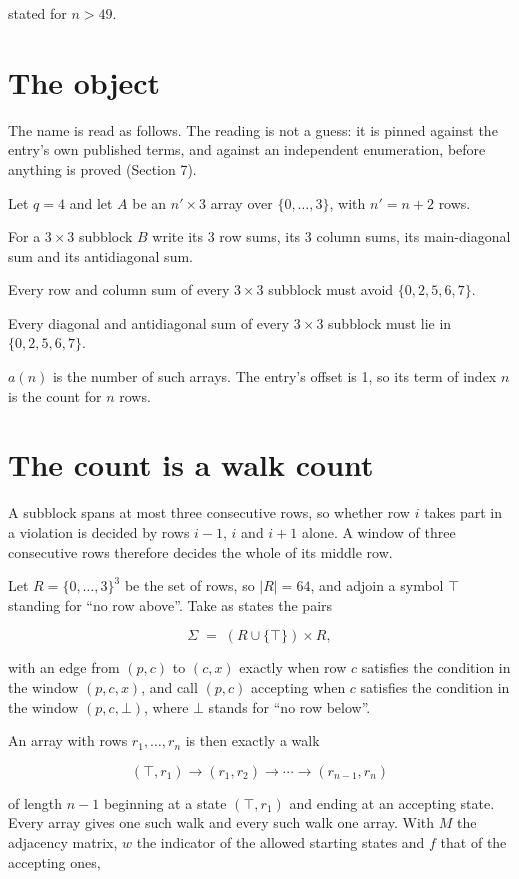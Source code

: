 \documentclass[11pt]{article}
\theoremstyle{definition}
\begin{document}
stated for $n > 49$.

\section{The object}

The name is read as follows. The reading is not a guess: it is pinned against the entry's own published terms, and against an independent enumeration, before anything is proved (Section 7).

Let $q = 4$ and let $A$ be an $n' \times 3$ array over $\{0,\dots,3\}$, with $n' = n + 2$ rows.

For a $3\times3$ subblock $B$ write its 3 row sums, its 3 column sums, its main-diagonal sum and its antidiagonal sum.

Every row and column sum of every $3\times3$ subblock must avoid $\{0, 2, 5, 6, 7\}$.

Every diagonal and antidiagonal sum of every $3\times3$ subblock must lie in $\{0, 2, 5, 6, 7\}$.

$a(n)$ is the number of such arrays. The entry's offset is 1, so its term of index $n$ is the count for $n$ rows.

\section{The count is a walk count}

A subblock spans at most three consecutive rows, so whether row $i$ takes part in a violation is decided by rows $i-1$, $i$ and $i+1$ alone. A window of three consecutive rows therefore decides the whole of its middle row.

Let $R = \{0,\dots,3\}^{3}$ be the set of rows, so $|R| = 64$, and adjoin a symbol $\top$ standing for ``no row above''. Take as states the pairs

\[\Sigma \;=\; (R \cup \{\top\}) \times R,\]

with an edge from $(p,c)$ to $(c,x)$ exactly when row $c$ satisfies the condition in the window $(p,c,x)$, and call $(p,c)$ accepting when $c$ satisfies the condition in the window $(p,c,\bot)$, where $\bot$ stands for ``no row below''.

An array with rows $r_1,\dots,r_n$ is then exactly a walk

\[(\top,r_1) \to (r_1,r_2) \to \cdots \to (r_{n-1},r_n)\]

of length $n-1$ beginning at a state $(\top,r_1)$ and ending at an accepting state. Every array gives one such walk and every such walk one array. With $M$ the adjacency matrix, $w$ the indicator of the allowed starting states and $f$ that of the accepting ones,
\end{document}

